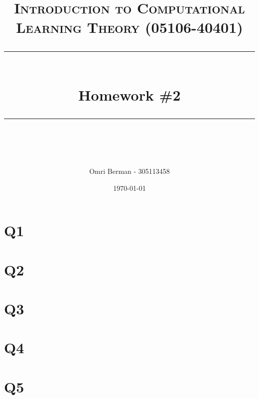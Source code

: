 \documentclass{article} %
\title{
\normalfont \normalsize 
\textsc{Introduction to Computational Learning Theory (05106-40401)} \\
[10pt] 
\rule{\linewidth}{0.5pt} \\[6pt] 
\huge Homework \#2 \\
\rule{\linewidth}{2pt}  \\[10pt]
}
\author{Omri Berman - 305113458}
\date{\normalsize \today}
\begin{document}
\maketitle
\noindent

\section*{Q1}


\section*{Q2}


\section*{Q3}


\section*{Q4}


\section*{Q5}

\end{document}
